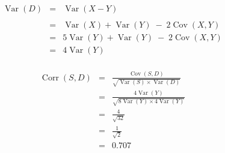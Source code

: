 \documentclass[a4paper,12pt]{article}
\begin{document}
\begin{eqnarray*}
\operatorname{Var}(D) &=&  \operatorname{Var}(X - Y)\\   \\
&=& \operatorname{Var}(X) + \operatorname{Var}(Y) \;-\; 2\operatorname{Cov}(X,Y) \\
&=& 5 \operatorname{Var}(Y) + \operatorname{Var}(Y) \;-\; 2\operatorname{Cov}(X,Y) \\
&=& 4\operatorname{Var}(Y)\\
\end{eqnarray*}

\begin{eqnarray*} 
\operatorname{Corr}(S,D) &=& \frac{\operatorname{Cov}(S,D)}{ \sqrt{\operatorname{Var}(S) \times \operatorname{Var}(D)}}\\
 &=& \frac{4\operatorname{Var}(Y)}{ \sqrt{ 8 \operatorname{Var}(Y) \times 4 \operatorname{Var}(Y)}}\\
 &=& \frac{4}{ \sqrt{32} }\\
 &=& \frac{1}{\sqrt{2}}\\
 &=& 0.707\\
 \end{eqnarray*}
\end{document}
